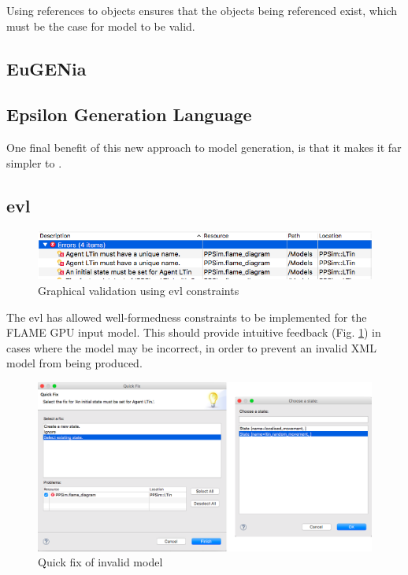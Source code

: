 \documentclass{UoYCSproject}
\begin{document}
Using references to objects ensures that the objects being referenced exist, which must be the case for model to be valid.

\subsection{EuGENia}

\subsection{Epsilon Generation Language}
One final benefit of this new approach to model generation, is that it makes it far simpler to .


\subsection{\acrlong{evl}}
\begin{figure}[htp]
\centering
\includegraphics[width=\textwidth]{Appendix/validation_gmf}
\caption{Graphical validation using \gls{evl} constraints}
\label{fig:validation_gmf}
\end{figure}

The \gls{evl} has allowed well-formedness constraints to be implemented for the \gls{FLAME GPU} input model.
This should provide intuitive feedback (Fig. \ref{fig:validation_gmf}) in cases where the model may be incorrect, in order to prevent an invalid XML model from being produced.

\begin{figure}[htp]
\centering
\includegraphics[width=\textwidth]{Appendix/validation_quickfix_gmf}
\caption{Quick fix of invalid model}
\label{fig:validation_quickfix_gmf}
\end{figure}
\end{document}
